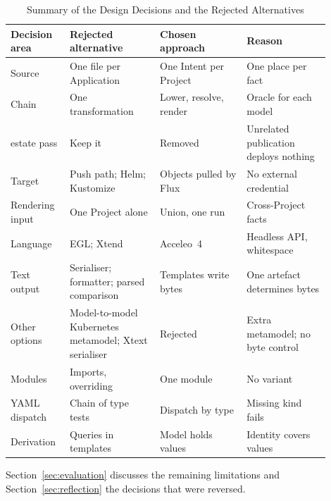 \begin{table}[!htbp]
\centering
\small
\begin{tabular}{>{\raggedright\arraybackslash}p{0.15\linewidth}>{\raggedright\arraybackslash}p{0.26\linewidth}>{\raggedright\arraybackslash}p{0.25\linewidth}>{\raggedright\arraybackslash}p{0.24\linewidth}}
\hline
\textbf{Decision area} & \textbf{Rejected alternative} & \textbf{Chosen approach} & \textbf{Reason} \\
\hline
Source & One file per Application & One Intent per Project & One place per fact \\
Chain & One transformation & Lower, resolve, render & Oracle for each model \\
estate pass & Keep it & Removed & Unrelated publication deploys nothing \\
Target & Push path; Helm; Kustomize & Objects pulled by Flux & No external credential \\
Rendering input & One Project alone & Union, one run & Cross-Project facts \\
Language & EGL; Xtend & Acceleo~4 & Headless API, whitespace \\
Text output & Serialiser; formatter; parsed comparison & Templates write bytes & One artefact determines bytes \\
Other options & Model-to-model Kubernetes metamodel; Xtext serialiser & Rejected & Extra metamodel; no byte control \\
Modules & Imports, overriding & One module & No variant \\
YAML dispatch & Chain of type tests & Dispatch by type & Missing kind fails \\
Derivation & Queries in templates & Model holds values & Identity covers values \\
\hline
\end{tabular}
\caption{Summary of the Design Decisions and the Rejected Alternatives}
\label{tab:choices}
\end{table}

Section~\ref{sec:evaluation} discusses the remaining limitations and
Section~\ref{sec:reflection} the decisions that were reversed.
